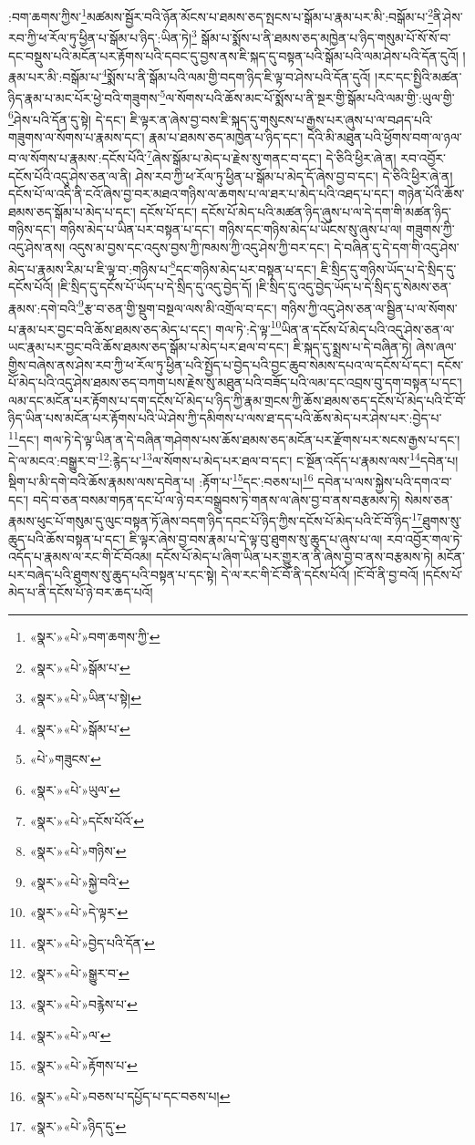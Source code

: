 :བག་ཆགས་ཀྱིས་\footnote{«སྣར་»«པེ་»བག་ཆགས་ཀྱི་}མཚམས་སྦྱོར་བའི་ཉོན་མོངས་པ་ཐམས་ཅད་སྤངས་པ་སྒོམ་པ་རྣམ་པར་མི་:བསྒོམ་པ་\footnote{«སྣར་»«པེ་»སྒོམ་པ་}ནི་ཤེས་རབ་ཀྱི་ཕ་རོལ་ཏུ་ཕྱིན་པ་སྒོམ་པ་ཉིད་:ཡིན་ཏེ།\footnote{«སྣར་»«པེ་»ཡིན་པ་སྟེ།} སྒོམ་པ་སྨོས་པ་ནི་ཐམས་ཅད་མཁྱེན་པ་ཉིད་གསུམ་པོ་སོ་སོ་བ་དང་བསྡུས་པའི་མངོན་པར་རྟོགས་པའི་དབང་དུ་བྱས་ནས་ཇི་སྐད་དུ་བསྟན་པའི་སྒོམ་པའི་ལམ་ཤེས་པའི་དོན་དུའོ། །རྣམ་པར་མི་:བསྒོམ་པ་\footnote{«སྣར་»«པེ་»སྒོམ་པ་}སྨོས་པ་ནི་སྒོམ་པའི་ལམ་གྱི་བདག་ཉིད་ཇི་ལྟ་བ་ཤེས་པའི་དོན་དུའོ། །རང་དང་སྤྱིའི་མཚན་ཉིད་རྣམ་པ་མང་པོར་ཕྱེ་བའི་གཟུགས་\footnote{«པེ་»གཟུངས་}ལ་སོགས་པའི་ཆོས་མང་པོ་སྨོས་པ་ནི་སྔར་གྱི་སྒོམ་པའི་ལམ་གྱི་:ཡུལ་གྱི་\footnote{«སྣར་»«པེ་»ཡུལ་}ཤེས་པའི་དོན་དུ་སྟེ། དེ་དང་། ཇི་ལྟར་ན་ཞེས་བྱ་བས་ཇི་སྐད་དུ་གསུངས་པ་རྒྱས་པར་ཞུས་པ་ལ་བཤད་པའི་གཟུགས་ལ་སོགས་པ་རྣམས་དང་། རྣམ་པ་ཐམས་ཅད་མཁྱེན་པ་ཉིད་དང་། དེའི་མི་མཐུན་པའི་ཕྱོགས་བག་ལ་ཉལ་བ་ལ་སོགས་པ་རྣམས་:དངོས་པོའི་\footnote{«སྣར་»«པེ་»དངོས་པོའོ་}ཞེས་སྒོམ་པ་མེད་པ་རྗེས་སུ་གནང་བ་དང་། དེ་ཅིའི་ཕྱིར་ཞེ་ན། རབ་འབྱོར་དངོས་པོའི་འདུ་ཤེས་ཅན་ལ་ནི། ཤེས་རབ་ཀྱི་ཕ་རོལ་ཏུ་ཕྱིན་པ་སྒོམ་པ་མེད་དོ་ཞེས་བྱ་བ་དང་། དེ་ཅིའི་ཕྱིར་ཞེ་ན། དངོས་པོ་ལ་འདི་ནི་ངའོ་ཞེས་བྱ་བར་མཐའ་གཉིས་ལ་ཆགས་པ་ལ་ཐར་པ་མེད་པའི་འཐད་པ་དང་། གཉེན་པོའི་ཆོས་ཐམས་ཅད་སྒོམ་པ་མེད་པ་དང་། དངོས་པོ་དང་། དངོས་པོ་མེད་པའི་མཚན་ཉིད་ཞུས་པ་ལ་དེ་དག་གི་མཚན་ཉིད་གཉིས་དང་། གཉིས་མེད་པ་ཡིན་པར་བསྟན་པ་དང་། གཉིས་དང་གཉིས་མེད་པ་ཡོངས་སུ་ཞུས་པ་ལ། གཟུགས་ཀྱི་འདུ་ཤེས་ནས། འདུས་མ་བྱས་དང་འདུས་བྱས་ཀྱི་ཁམས་ཀྱི་འདུ་ཤེས་ཀྱི་བར་དང་། དེ་བཞིན་དུ་དེ་དག་གི་འདུ་ཤེས་མེད་པ་རྣམས་རིམ་པ་ཇི་ལྟ་བ་:གཉིས་པ་\footnote{«སྣར་»«པེ་»གཉིས་}དང་གཉིས་མེད་པར་བསྟན་པ་དང་། ཇི་སྲིད་དུ་གཉིས་ཡོད་པ་དེ་སྲིད་དུ་དངོས་པོའོ། །ཇི་སྲིད་དུ་དངོས་པོ་ཡོད་པ་དེ་སྲིད་དུ་འདུ་བྱེད་དོ། །ཇི་སྲིད་དུ་འདུ་བྱེད་ཡོད་པ་དེ་སྲིད་དུ་སེམས་ཅན་རྣམས་:དགེ་བའི་\footnote{«སྣར་»«པེ་»སྐྱེ་བའི་}རྩ་བ་ཅན་གྱི་སྡུག་བསྔལ་ལས་མི་འགྲོལ་བ་དང་། གཉིས་ཀྱི་འདུ་ཤེས་ཅན་ལ་སྦྱིན་པ་ལ་སོགས་པ་རྣམ་པར་བྱང་བའི་ཆོས་ཐམས་ཅད་མེད་པ་དང་། གལ་ཏེ་:དེ་ལྟ་\footnote{«སྣར་»«པེ་»དེ་ལྟར་}ཡིན་ན་དངོས་པོ་མེད་པའི་འདུ་ཤེས་ཅན་ལ་ཡང་རྣམ་པར་བྱང་བའི་ཆོས་ཐམས་ཅད་སྒོམ་པ་མེད་པར་ཐལ་བ་དང་། ཇི་སྐད་དུ་སྨྲས་པ་དེ་བཞིན་ཏེ། ཞེས་ཞལ་གྱིས་བཞེས་ནས་ཤེས་རབ་ཀྱི་ཕ་རོལ་ཏུ་ཕྱིན་པའི་སྤྱོད་པ་བྱེད་པའི་བྱང་ཆུབ་སེམས་དཔའ་ལ་དངོས་པོ་དང་། དངོས་པོ་མེད་པའི་འདུ་ཤེས་ཐམས་ཅད་བཀག་པས་རྗེས་སུ་མཐུན་པའི་བཟོད་པའི་ལམ་དང་འབྲས་བུ་དག་བསྟན་པ་དང་། ལམ་དང་མངོན་པར་རྟོགས་པ་དག་དངོས་པོ་མེད་པ་ཉིད་ཀྱི་རྣམ་གྲངས་ཀྱི་ཆོས་ཐམས་ཅད་དངོས་པོ་མེད་པའི་ངོ་བོ་ཉིད་ཡིན་པས་མངོན་པར་རྟོགས་པའི་ཡེ་ཤེས་ཀྱི་དམིགས་པ་ལས་ཐ་དད་པའི་ཆོས་མེད་པར་ཤེས་པར་:བྱེད་པ་\footnote{«སྣར་»«པེ་»བྱེད་པའི་དོན་}དང་། གལ་ཏེ་དེ་ལྟ་ཡིན་ན་དེ་བཞིན་གཤེགས་པས་ཆོས་ཐམས་ཅད་མངོན་པར་རྫོགས་པར་སངས་རྒྱས་པ་དང་། དེ་ལ་མངའ་:བསྒྱུར་བ་\footnote{«སྣར་»«པེ་»སྒྱུར་བ་}:རྙེད་པ་\footnote{«སྣར་»«པེ་»བརྙེས་པ་}ལ་སོགས་པ་མེད་པར་ཐལ་བ་དང་། ང་སྔོན་འདོད་པ་རྣམས་ལས་\footnote{«སྣར་»«པེ་»ལ་}དབེན་པ། སྡིག་པ་མི་དགེ་བའི་ཆོས་རྣམས་ལས་དབེན་པ། :རྟོག་པ་\footnote{«སྣར་»«པེ་»རྟོགས་པ་}དང་:བཅས་པ།\footnote{«སྣར་»«པེ་»བཅས་པ་དཔྱོད་པ་དང་བཅས་པ།} དབེན་པ་ལས་སྐྱེས་པའི་དགའ་བ་དང་། བདེ་བ་ཅན་བསམ་གཏན་དང་པོ་ལ་ཉེ་བར་བསྒྲུབས་ཏེ་གནས་ལ་ཞེས་བྱ་བ་ནས་བརྩམས་ཏེ། སེམས་ཅན་རྣམས་ཕུང་པོ་གསུམ་དུ་ལུང་བསྟན་ཏོ་ཞེས་བདག་ཉིད་དབང་པོ་ཉིད་ཀྱིས་དངོས་པོ་མེད་པའི་ངོ་བོ་ཉིད་\footnote{«སྣར་»«པེ་»ཉིད་དུ་}ཐུགས་སུ་ཆུད་པའི་ཆོས་བསྟན་པ་དང་། ཇི་ལྟར་ཞེས་བྱ་བས་རྣམ་པ་དེ་ལྟ་བུ་ཐུགས་སུ་ཆུད་པ་ཞུས་པ་ལ། རབ་འབྱོར་གལ་ཏེ་འདོད་པ་རྣམས་ལ་རང་གི་ངོ་བོའམ། དངོས་པོ་མེད་པ་ཞིག་ཡིན་པར་གྱུར་ན་ནི་ཞེས་བྱ་བ་ནས་བརྩམས་ཏེ། མངོན་པར་བཞེད་པའི་ཐུགས་སུ་ཆུད་པའི་བསྟན་པ་དང་སྟེ། དེ་ལ་རང་གི་ངོ་བོ་ནི་དངོས་པོའོ། །ངོ་བོ་ནི་བྱ་བའོ། །དངོས་པོ་མེད་པ་ནི་དངོས་པོ་ཉེ་བར་ཆད་པའོ། 
